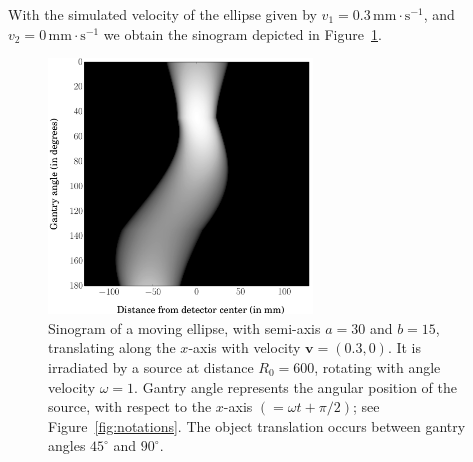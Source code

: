 \documentclass[letterpaper,twocolumn]{IEEEtran}
\newcommand{\bv}{\mathbf{v}}
\begin{document}
With the simulated velocity of the ellipse given by $v_1 = 0.3 \, \textrm{mm} \cdot \textrm{s}^{-1}$, and $v_2 = 0 \, \textrm{mm} \cdot \textrm{s}^{-1}$ we obtain the sinogram depicted in Figure~\ref{fig:sinogram}.
\begin{figure}[!ht]
	\centering
	\includegraphics[width=70mm]{figs/sinogram.png}
	\caption{Sinogram of a moving ellipse, with semi-axis $a = 30$ and $b = 15$, translating along the $x$-axis with velocity $\bv = (0.3,0)$. It is irradiated by a source at distance $R_0 = 600$, rotating with angle velocity $\omega = 1$. Gantry angle represents the angular position of the source, with respect to the $x$-axis $(= \omega t + \pi/2)$; see Figure~\ref{fig:notations}. The object translation occurs between gantry angles $45^{\circ}$ and $90^{\circ}$.\label{fig:sinogram}}
\end{figure}
\end{document}
